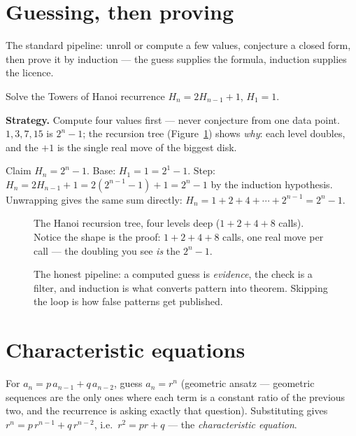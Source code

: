 \section{Guessing, then proving}\label{sec:guess}
The standard pipeline: unroll or compute a few values, conjecture a
closed form, then prove it by induction --- the guess supplies the
formula, induction supplies the licence.

\begin{example}\label{ex:hanoi}
Solve the Towers of Hanoi recurrence $H_n = 2H_{n-1} + 1$, $H_1 = 1$.
\par\smallskip
\textbf{Strategy.} Compute four values first --- never conjecture from
one data point. $1, 3, 7, 15$ is $2^n - 1$; the recursion tree
(Figure~\ref{fig:hanoi}) shows \emph{why}: each level doubles, and the
$+1$ is the single real move of the biggest disk.
\par\smallskip
\begin{solution}
Claim $H_n = 2^n - 1$. Base: $H_1 = 1 = 2^1 - 1$. Step:
$H_n = 2H_{n-1} + 1 = 2(2^{n-1} - 1) + 1 = 2^n - 1$ by the induction
hypothesis. Unwrapping gives the same sum directly:
$H_n = 1 + 2 + 4 + \cdots + 2^{n-1} = 2^n - 1$.
\end{solution}
\end{example}

\begin{figure}[ht]\centering

\caption{The Hanoi recursion tree, four levels deep ($1+2+4+8$ calls). Notice the shape is the
proof: $1 + 2 + 4 + 8$ calls, one real move per call --- the doubling
you see \emph{is} the $2^n - 1$.}
\label{fig:hanoi}
\end{figure}

\begin{figure}[ht]\centering

\caption{The honest pipeline: a computed guess is \emph{evidence}, the
check is a filter, and induction is what converts pattern into theorem.
Skipping the loop is how false patterns get published.}
\label{fig:guessloop}
\end{figure}

\section{Characteristic equations}\label{sec:chareq}
For $a_n = p\,a_{n-1} + q\,a_{n-2}$, guess $a_n = r^n$ (geometric
ansatz --- geometric sequences are the only ones where each term is a
constant ratio of the previous two, and the recurrence is asking
exactly that question). Substituting gives $r^n = p\,r^{n-1} + q\,r^{n-2}$,
i.e.\ $r^2 = pr + q$ --- the \emph{characteristic equation}.

